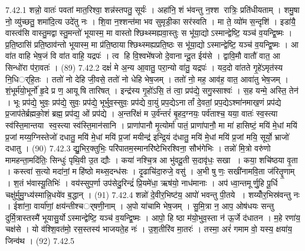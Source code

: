 7.42.1
शन्नो॒ वातः॑ पवतां मात॒रिश्वा॒ शन्न॑स्तपतु॒ सूर्यः॑ । अहा॑नि॒ शं भ॑वन्तु न॒श्श रात्रिः॒ प्रति॑धीयताम् । शमु॒षा नो॒ व्यु॑च्छतु॒ शमा॑दि॒त्य उदे॑तु नः । शि॒वा न॒श्शन्त॑मा भव सुमृडी॒का सर॑स्वति । मा ते॒ व्यो॑म स॒न्दृशि॑ । इडा॑यै॒ वास्त्व॑सि वास्तु॒मद्वास्तु॒मन्तो॑ भूयास्म॒ मा वास्तोश्छिथ्स्मह्यवा॒स्तुः स भू॑या॒द्योऽस्मान्द्वेष्टि॒ यञ्च॑ व॒यन्द्वि॒ष्मः । प्र॒ति॒ष्ठासि॑ प्रति॒ष्ठाव॑न्तो भूयास्म॒ मा प्र॑ति॒ष्ठायाश्छिथ्स्मह्यप्रति॒ष्ठः स भू॑या॒द्योऽस्मान्द्वेष्टि॒ यञ्च॑ व॒यन्द्वि॒ष्मः । आ वा॑त वाहि भेष॒जं वि वा॑त वाहि॒ यद्रपः॑ । त्व हि वि॒श्वभे॑षजो दे॒वानान्दू॒त ईय॑से । द्वावि॒मौ वातौ॑ वात॒ आ सिन्धो॑रा प॑रा॒वतः॑ । (89)
7.42.2
दक्षं॑ मे अ॒न्य आ॒वातु॒ परा॒न्यो वा॑तु॒ यद्रपः॑ । यद॒दो वा॑तते गृ॒हे॑ऽमृत॑स्य नि॒धिर््हि॒तः । ततो॑ नो देहि जी॒वसे॒ ततो॑ नो धेहि भेष॒जम् । ततो॑ नो॒ मह॒ आव॑ह॒ वात॒ आवा॑तु भेष॒जम् । शं॒भूर्म॑यो॒भूर्नो॑ हृ॒दे प्र ण॒ आयूषि तारिषत् । इन्द्र॑स्य गृ॒हो॑ऽसि॒ तं त्वा॒ प्रप॑द्ये॒ सगु॒स्साश्वः॑ । स॒ह यन्मे॒ अस्ति॒ तेन॑ । भूः प्रप॑द्ये॒ भुवः॒ प्रप॑द्ये॒ सुवः॒ प्रप॑द्ये॒ भूर्भुव॒स्सुवः॒ प्रप॑द्ये वा॒युं प्रप॒द्येऽनार्तां दे॒वतां॒ प्रप॒द्येऽश्मा॑नमाख॒णं प्रप॑द्ये प्र॒जाप॑तेर्ब्रह्मको॒शं ब्रह्म॒ प्रप॑द्य॒ ओं प्रप॑द्ये । अ॒न्तरि॑क्षं म उ॒र्व॑न्तरं॑ बृ॒हद॒ग्नयः॒ पर्व॑ताश्च॒ यया॒ वातः॑ स्व॒स्त्या स्व॑स्ति॒मान्तया स्व॒स्त्या स्व॑स्ति॒मान॑सानि । प्राणा॑पानौ मृ॒त्योर्मा॑ पातं॒ प्राणा॑पानौ॒ मा मा॑ हासिष्टं॒ मयि॑ मे॒धां मयि॑ प्र॒जां मय्य॒ग्निस्तेजो॑ दधातु॒ मयि॑ मे॒धां मयि॑ प्र॒जां मयीन्द्र॑ इन्द्रि॒यं द॑धातु॒ मयि॑ मे॒धां मयि॑ प्र॒जां मयि॒ सूर्यो॒ भ्राजो॑ दधातु । (90)
7.42.3
द्यु॒भिर॒क्तुभिः॒ परि॑पातम॒स्मानरि॑ष्टेभिरश्विना॒ सौभ॑गेभिः । तन्नो॑ मि॒त्रो वरु॑णो मामहन्ता॒मदि॑तिः॒ सिन्धुः॑ पृथि॒वी उ॒त द्यौः । कया॑ नश्चि॒त्र आ भु॑वदू॒ती स॒दावृ॑धः॒ सखा । कया॒ शचि॑ष्ठया वृ॒ता । कस्त्वा॑ स॒त्यो मदा॑नां॒ महि॑ष्ठो मथ्स॒दन्ध॑सः । दृ॒ढाचि॑दा॒रुजे॒ वसु॑ । अ॒भी षु णः॒ सखी॑नामवि॒ता ज॑रितॄ॒णाम् । श॒तं भ॑वास्यू॒तिभिः॑ । वय॑स्सुप॒र्णा उप॑सेदु॒रिन्द्रं॑ प्रि॒यमे॑धा॒ ऋष॑यो॒ नाध॑मानाः । अप॑ ध्वा॒न्तमूर्णु॒हि पू॒र्धि चक्षु॑र्मुमु॒ग्ध्य॑स्मान्नि॒धये॑व ब॒द्धान् । (91)
7.42.4
शन्नो॑ दे॒वीर॒भिष्ट॑य॒ आपो॑ भवन्तु पी॒तये । शय्योँर॒भिस्र॑वन्तु नः । ईशा॑ना॒ वार्या॑णां॒ क्षय॑न्तीश्चर््षणी॒नाम् । अ॒पो या॑चामि भेष॒जम् । सु॒मि॒त्रा न॒ आप॒ ओष॑धयः सन्तु दुर्मि॒त्रास्तस्मै॑ भूयासु॒र्योऽस्मान्द्वेष्टि॒ यञ्च॑ व॒यन्द्वि॒ष्मः । आपो॒ हि ष्ठा म॑यो॒भुव॒स्ता न॑ ऊ॒र्जे द॑धातन । म॒हे रणा॑य॒ चक्ष॑से । यो व॑श्शि॒वत॑मो॒ रस॒स्तस्य॑ भाजयते॒ह नः॑ । उ॒श॒तीरि॑व मा॒तरः॑ । तस्मा॒ अरं॑ गमाम वो॒ यस्य॒ क्षया॑य॒ जिन्व॑थ । (92)
7.42.5
